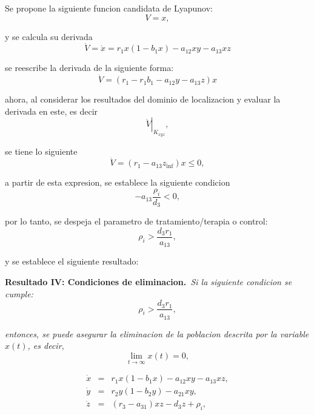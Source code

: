 \documentclass[letterpaper,11pt]{article}
\begin{document}
Se propone la siguiente funcion candidata de Lyapunov:%
\begin{equation*}
V=x,
\end{equation*}

y se calcula su derivada%
\begin{equation*}
\dot{V}=\dot{x}=r_{1}x(1-b_{1}x)-a_{12}xy-a_{13}xz
\end{equation*}

se reescribe la derivada de la siguiente forma:%
\begin{equation*}
\dot{V}=(r_{1}-r_{1}b_{1}-a_{12}y-a_{13}z)x
\end{equation*}

ahora, al considerar los resultados del dominio de localizacion y evaluar la
derivada en este, es decir%
\begin{equation*}
\left. \dot{V}\right\vert _{K_{xyz}},
\end{equation*}

se tiene lo siguiente%
\begin{equation*}
\dot{V}=(r_{1}-a_{13}z_{\inf })x\leq 0,
\end{equation*}

a partir de esta expresion, se establece la siguiente condicion%
\begin{equation*}
-a_{13}\frac{\rho _{i}}{d_{3}}<0,
\end{equation*}

por lo tanto, se despeja el parametro de tratamiento/terapia o control:%
\begin{equation*}
\rho _{i}>\frac{d_{3}r_{1}}{a_{13}},
\end{equation*}

y se establece el siguiente resultado:

\bigskip

\textbf{Resultado IV: Condiciones de eliminacion.}\textit{\ Si la siguiente
condicion se cumple:}%
\begin{equation*}
\rho _{i}>\frac{d_{3}r_{1}}{a_{13}},
\end{equation*}

\textit{entonces, se puede asegurar la eliminacion de la poblacion descrita
por la variable }$x(t)$\textit{, es decir,}%
\begin{equation*}
\lim_{t\rightarrow \infty }x(t)=0,
\end{equation*}

\begin{eqnarray*}
\dot{x} &=&r_{1}x(1-b_{1}x)-a_{12}xy-a_{13}xz, \\
\dot{y} &=&r_{2}y(1-b_{2}y)-a_{21}xy, \\
\dot{z} &=&(r_{3}-a_{31})xz-d_{3}z+\rho _{i},
\end{eqnarray*}

\bigskip

\bigskip

\bigskip

\bigskip

\bigskip

\bigskip

\bigskip
\end{document}
